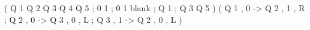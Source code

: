 ( Q 1 Q 2 Q 3 Q 4 Q 5 ; 0 1 ; 0 1 blank ; Q 1 ; Q 3 Q 5 )
( Q 1 , 0 -> Q 2 , 1 , R
; Q 2 , 0 -> Q 3 , 0 , L
; Q 3 , 1 -> Q 2 , 0 , L )
